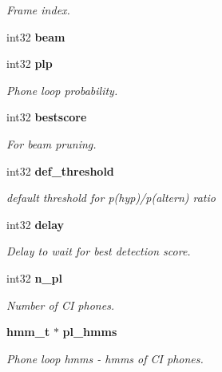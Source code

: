 \begin{DoxyCompactItemize}
\begin{DoxyCompactList}\small\item\em Frame index. \end{DoxyCompactList}\item 
int32 {\bfseries beam}\label{structkws__search__s_a5a84597099359059301dc6124579732e}

\item 
int32 {\bf plp}\label{structkws__search__s_a3bfc1d19e39d1cd321ce47280f1abe00}

\begin{DoxyCompactList}\small\item\em Phone loop probability. \end{DoxyCompactList}\item 
int32 {\bf bestscore}\label{structkws__search__s_a0a04bba471516468d1b2bea14632f255}

\begin{DoxyCompactList}\small\item\em For beam pruning. \end{DoxyCompactList}\item 
int32 {\bf def\+\_\+threshold}\label{structkws__search__s_afce4456a796dbc72149d7a47159ccca9}

\begin{DoxyCompactList}\small\item\em default threshold for p(hyp)/p(altern) ratio \end{DoxyCompactList}\item 
int32 {\bf delay}\label{structkws__search__s_acf2597fd017db4c2f90a9ba54e08a20c}

\begin{DoxyCompactList}\small\item\em Delay to wait for best detection score. \end{DoxyCompactList}\item 
int32 {\bf n\+\_\+pl}\label{structkws__search__s_aab6e42d0c93af992c16e2a75db386df4}

\begin{DoxyCompactList}\small\item\em Number of C\+I phones. \end{DoxyCompactList}\item 
{\bf hmm\+\_\+t} $\ast$ {\bf pl\+\_\+hmms}\label{structkws__search__s_a7b501f4cc5f4efb7b4ca0259afcf4e05}

\begin{DoxyCompactList}\small\item\em Phone loop hmms -\/ hmms of C\+I phones. \end{DoxyCompactList}\end{DoxyCompactItemize}



